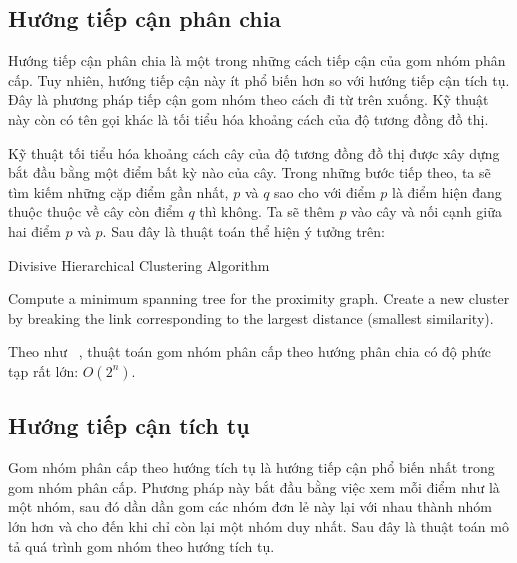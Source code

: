 \subsection{Hướng tiếp cận phân chia}
Hướng tiếp cận phân chia là một trong những cách tiếp cận của gom nhóm phân cấp.
Tuy nhiên, hướng tiếp cận này ít phổ biến hơn so với hướng tiếp cận tích tụ.
Đây là phương pháp tiếp cận gom nhóm theo cách đi từ trên xuống.
Kỹ thuật này còn có tên gọi khác là tối tiểu hóa khoảng cách của độ tương đồng đồ thị.

Kỹ thuật tối tiểu hóa khoảng cách cây của độ tương đồng đồ thị được xây dựng bắt đầu bằng một điểm bất kỳ nào của cây.
Trong những bước tiếp theo, ta sẽ tìm kiếm những cặp điểm gần nhất, $p$ và $q$ sao cho với điểm $p$ là điểm hiện đang thuộc thuộc về cây còn điểm $q$ thì không.
Ta sẽ thêm $p$ vào cây và nối cạnh giữa hai điểm $p$ và $p$.
Sau đây là thuật toán thể hiện ý tưởng trên:

\begin{algorithm}
\caption{Divisive Hierarchical Clustering Algorithm}
\label{alg:Divisive}
\begin{algorithmic}[1]
\State Compute a minimum spanning tree for the proximity graph.
\Repeat
\State Create a new cluster by breaking the link corresponding to the largest distance (smallest similarity).
\end{algorithmic}
\end{algorithm}

Theo như ~\cite{wiki-HAC}, thuật toán gom nhóm phân cấp theo hướng phân chia có độ phức tạp rất lớn: $O(2^n)$.

		
		
\subsection{Hướng tiếp cận tích tụ}
Gom nhóm phân cấp theo hướng tích tụ là hướng tiếp cận phổ biến nhất trong gom nhóm phân cấp.
Phương pháp này bắt đầu bằng việc xem mỗi điểm như là một nhóm, sau đó dần dần gom các nhóm đơn lẻ này lại với nhau thành nhóm lớn hơn và cho đến khi chỉ còn lại một nhóm duy nhất.
Sau đây là thuật toán mô tả quá trình gom nhóm theo hướng tích tụ.

